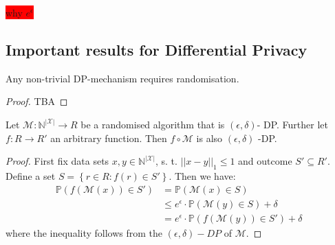 \colorbox{red}{why $e^\epsilon$}

\begin{ex}
    
\end{ex}

\subsection{Important results for Differential Privacy}

\begin{thm}
    Any non-trivial DP-mechanism requires randomisation.
\end{thm}
\begin{proof}
    TBA
\end{proof}

\begin{thm}
    Let $\mathcal{M}: \mathbb{N}^{|\mathcal{X}|} \rightarrow R$ be a randomised algorithm that is $(\epsilon, \delta)$- DP. Further let $f: R \rightarrow R'$ an arbitrary function. Then $f \circ \mathcal{M}$ is also $(\epsilon, \delta)$ -DP.
\end{thm}
\begin{proof}
    First fix data sets $x,y \in \mathbb{N}^{|\mathcal{X}|}$, s. t. $||x-y||_1\le 1$ and outcome $S' \subseteq R'$. Define a set $S=\left\{r\in R: f(r) \in S'\right\}$. Then we have:
    \begin{align}
        \mathbb{P}(f(\mathcal{M}(x))\in S') &= \mathbb{P}(\mathcal{M}(x)\in S) \nonumber \\
        &\le e^\epsilon \cdot \mathbb{P}(\mathcal{M}(y)\in S) + \delta \nonumber \\
        &= e^\epsilon \cdot \mathbb{P}(f(\mathcal{M}(y))\in S') + \delta
    \end{align}
    where the inequality follows from the $(\epsilon, \delta)-DP$ of $\mathcal{M}$.
\end{proof}


